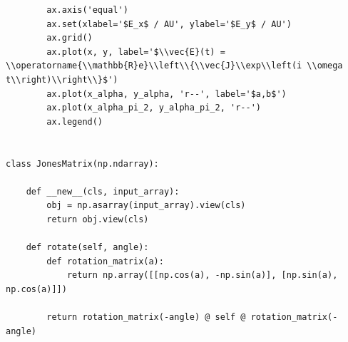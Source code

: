\documentclass[a4paper, titlepage,  ngerman]{book}
\begin{document}
\begin{verbatim}
        ax.axis('equal')
        ax.set(xlabel='$E_x$ / AU', ylabel='$E_y$ / AU')
        ax.grid()
        ax.plot(x, y, label='$\\vec{E}(t) = \\operatorname{\\mathbb{R}e}\\left\\{\\vec{J}\\exp\\left(i \\omega t\\right)\\right\\}$')
        ax.plot(x_alpha, y_alpha, 'r--', label='$a,b$')
        ax.plot(x_alpha_pi_2, y_alpha_pi_2, 'r--')
        ax.legend()


class JonesMatrix(np.ndarray):

    def __new__(cls, input_array):
        obj = np.asarray(input_array).view(cls)
        return obj.view(cls)

    def rotate(self, angle):
        def rotation_matrix(a):
            return np.array([[np.cos(a), -np.sin(a)], [np.sin(a), np.cos(a)]])

        return rotation_matrix(-angle) @ self @ rotation_matrix(-angle)
\end{verbatim}
\end{document}
